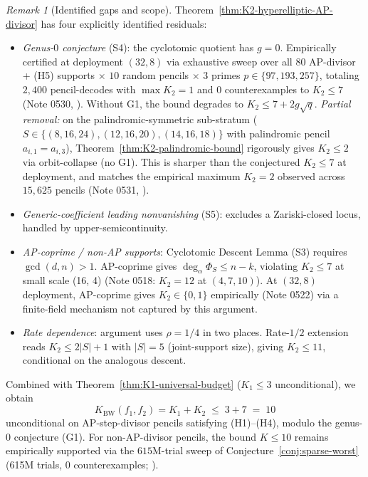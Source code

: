 \documentclass[11pt]{article}
\theoremstyle{definition}
\theoremstyle{remark}
\newtheorem{remark}[theorem]{Remark}
\begin{document}
\begin{remark}[Identified gaps and scope]
\label{rem:K2-hyperelliptic-gaps}
Theorem~\ref{thm:K2-hyperelliptic-AP-divisor} has four explicitly
identified residuals:
\begin{itemize}
\item[\emph{(G1)}] \emph{Genus-$0$ conjecture} (S4): the cyclotomic
  quotient has $g = 0$. Empirically certified at deployment $(32, 8)$
  via exhaustive sweep over all $80$ AP-divisor + (H5) supports
  $\times$ $10$ random pencils $\times$ $3$ primes
  $p \in \{97, 193, 257\}$, totaling $2{,}400$ pencil-decodes with
  $\max K_2 = 1$ and $0$ counterexamples to $K_2 \leq 7$
  (Note 0530, \cite{CompanionRepo}). Without G1, the bound degrades to
  $K_2 \leq 7 + 2g\sqrt q$.
  \emph{Partial removal:} on the palindromic-symmetric sub-stratum
  ($S \in \{(8,16,24), (12,16,20), (14,16,18)\}$ with palindromic
  pencil $a_{i,1} = a_{i,3}$), Theorem~\ref{thm:K2-palindromic-bound}
  rigorously gives $K_2 \leq 2$ via orbit-collapse (no G1).
  This is sharper than the conjectured $K_2 \leq 7$ at deployment, and
  matches the empirical maximum $K_2 = 2$ observed across $15{,}625$
  pencils (Note 0531, \cite{CompanionRepo}).
\item[\emph{(G2)}] \emph{Generic-coefficient leading nonvanishing}
  (S5): excludes a Zariski-closed locus, handled by upper-semicontinuity.
\item[\emph{(G3)}] \emph{AP-coprime / non-AP supports}: Cyclotomic
  Descent Lemma (S3) requires $\gcd(d, n) > 1$. AP-coprime gives
  $\deg_\alpha \Phi_S \leq n - k$, violating $K_2 \leq 7$ at small
  scale (16, 4) (Note 0518: $K_2 = 12$ at $(4, 7, 10)$). At $(32, 8)$
  deployment, AP-coprime gives $K_2 \in \{0, 1\}$ empirically (Note 0522)
  via a finite-field mechanism not captured by this argument.
\item[\emph{(G4)}] \emph{Rate dependence}: argument uses $\rho = 1/4$
  in two places. Rate-$1/2$ extension reads $K_2 \leq 2|S| + 1$ with
  $|S| = 5$ (joint-support size), giving $K_2 \leq 11$, conditional on
  the analogous descent.
\end{itemize}
Combined with Theorem~\ref{thm:K1-universal-budget} ($K_1 \leq 3$
unconditional), we obtain
\[
 K_{\mathrm{BW}}(f_1, f_2) = K_1 + K_2 \;\leq\; 3 + 7 \;=\; 10
\]
unconditional on AP-step-divisor pencils satisfying (H1)--(H4),
modulo the genus-$0$ conjecture (G1). For non-AP-divisor pencils, the
bound $K \leq 10$ remains empirically supported via the
$615$M-trial sweep of Conjecture~\ref{conj:sparse-worst} (615M trials,
0 counterexamples; \cite{CompanionRepo}).
\end{remark}
\end{document}
